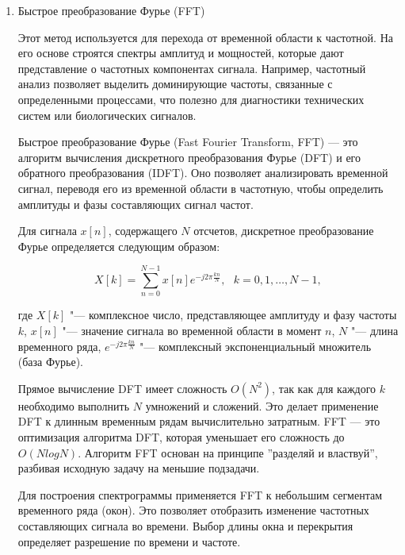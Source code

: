 \documentclass[spec, och, diploma]{SCWorks}
\begin{document}
            \begin{enumerate}
                \item Быстрое преобразование Фурье (FFT)
            
                    Этот метод используется для перехода от временной области к
                    частотной. На его основе строятся спектры амплитуд и
                    мощностей, которые дают представление о частотных
                    компонентах сигнала. Например, частотный анализ позволяет
                    выделить доминирующие частоты, связанные с определенными
                    процессами, что полезно для диагностики технических систем
                    или биологических сигналов.

                    Быстрое преобразование Фурье (Fast Fourier Transform, FFT) —
                    это алгоритм вычисления дискретного преобразования Фурье
                    (DFT) и его обратного преобразования (IDFT). Оно позволяет
                    анализировать временной сигнал, переводя его из временной
                    области в частотную, чтобы определить амплитуды и фазы
                    составляющих сигнал частот.

                    Для сигнала $x[n]$, содержащего $N$ отсчетов, дискретное
                    преобразование Фурье определяется следующим образом:

                    \[X[k] = \sum_{n=0}^{N - 1} x[n] e^{-j2\pi\frac{kn}{N}}, \text{ } k = 0, 1, \dots, N - 1,\]

                    где $X[k]$ "--- комплексное число, представляющее амплитуду
                    и фазу частоты $k$, $x[n]$ "--- значение сигнала во
                    временной области в момент $n$, $N$ "--- длина временного
                    ряда, $e^{-j2\pi\frac{kn}{N}}$ "---  комплексный
                    экспоненциальный множитель (база Фурье).

                    Прямое вычисление DFT имеет сложность $O(N^2)$, так как для
                    каждого $k$ необходимо выполнить $N$ умножений и сложений.
                    Это делает применение DFT к длинным временным рядам
                    вычислительно затратным. FFT — это оптимизация алгоритма
                    DFT, которая уменьшает его сложность до $O(NlogN)$. Алгоритм
                    FFT основан на принципе ''разделяй и властвуй'', разбивая
                    исходную задачу на меньшие подзадачи.

                    Для построения спектрограммы применяется FFT к небольшим
                    сегментам временного ряда (окон). Это позволяет отобразить
                    изменение частотных составляющих сигнала во времени. Выбор
                    длины окна и перекрытия определяет разрешение по времени и
                    частоте.


\end{enumerate}
\end{document}
